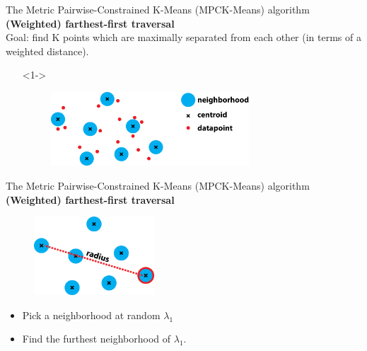 \documentclass{beamer}
\newlength{\tmpShadow}
\newcommand{\MyShadow}[2]{%
	\settowidth{\tmpShadow}{#1}
	\addtolength{\tmpShadow}{.1em}
	\raisebox{-0.25ex}{\textcolor{gray!70}{#1}}%
	\kern-\tmpShadow%
	\textcolor{#2}{#1}%
}
\begin{document}
{\begin{frame}{The Metric Pairwise-Constrained K-Means (MPCK-Means) algorithm}
	\textbf{(Weighted) farthest-first traversal}\\
	\vspace{4mm}
	Goal: find K points which are maximally separated from each other (in terms of a weighted distance).
	\vspace{10mm}
	\begin{itemize}[leftmargin=-2mm]
		\setlength\itemsep{2.3em}
		\item[]<1-> 	
		\begin{figure}[H]
			\centering
			\includegraphics[width=0.7\textwidth]{figures/farthest_setup}
		\end{figure}
	\end{itemize}
	\vspace{14mm}
\end{frame}	
\begin{frame}{The Metric Pairwise-Constrained K-Means (MPCK-Means) algorithm}
	\textbf{(Weighted) farthest-first traversal}\\
	\vspace{4mm}
	\begin{figure}[H]
		\centering
		\includegraphics[width=0.4\textwidth]{figures/farthest_1st}
	\end{figure}
	\vspace{2mm}
	\begin{itemize}[label={\MyShadow{$\bullet$}{blue!80}}]
		\item<1-> Pick a neighborhood at random $\lambda_1$
		\vspace{3mm}
		\item<1-> Find the furthest neighborhood of $\lambda_1$.	
	\end{itemize}	
	\vspace{24mm}

\end{frame}}
\end{document}
